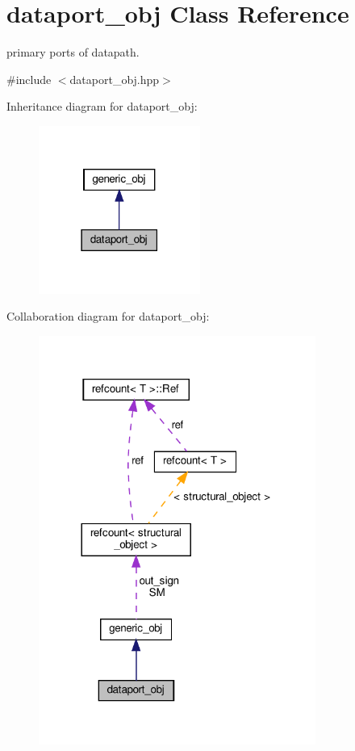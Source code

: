 \hypertarget{classdataport__obj}{}\section{dataport\+\_\+obj Class Reference}
\label{classdataport__obj}


primary ports of datapath.  




{\ttfamily \#include $<$dataport\+\_\+obj.\+hpp$>$}



Inheritance diagram for dataport\+\_\+obj\+:
\nopagebreak
\begin{figure}[H]
\begin{center}
\leavevmode
\includegraphics[width=150pt]{d2/d26/classdataport__obj__inherit__graph}
\end{center}
\end{figure}


Collaboration diagram for dataport\+\_\+obj\+:
\nopagebreak
\begin{figure}[H]
\begin{center}
\leavevmode
\includegraphics[width=257pt]{df/d47/classdataport__obj__coll__graph}
\end{center}
\end{figure}
